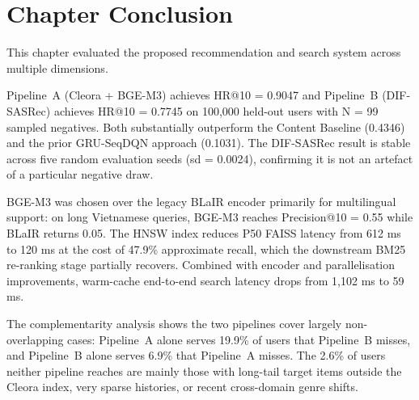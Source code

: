 \section{Chapter Conclusion}

This chapter evaluated the proposed recommendation and search system across multiple dimensions.

Pipeline~A (Cleora + BGE-M3) achieves HR@10 = 0.9047 and Pipeline~B (DIF-SASRec) achieves HR@10 = 0.7745 on 100,000 held-out users with N = 99 sampled negatives.
Both substantially outperform the Content Baseline (0.4346) and the prior GRU-SeqDQN approach (0.1031).
The DIF-SASRec result is stable across five random evaluation seeds (sd = 0.0024), confirming it is not an artefact of a particular negative draw.

BGE-M3 was chosen over the legacy BLaIR encoder primarily for multilingual support: on long Vietnamese queries, BGE-M3 reaches Precision@10 = 0.55 while BLaIR returns 0.05.
The HNSW index reduces P50 FAISS latency from 612 ms to 120 ms at the cost of 47.9\% approximate recall, which the downstream BM25 re-ranking stage partially recovers.
Combined with encoder and parallelisation improvements, warm-cache end-to-end search latency drops from 1,102 ms to 59 ms.

The complementarity analysis shows the two pipelines cover largely non-overlapping cases: Pipeline~A alone serves 19.9\% of users that Pipeline~B misses, and Pipeline~B alone serves 6.9\% that Pipeline~A misses.
The 2.6\% of users neither pipeline reaches are mainly those with long-tail target items outside the Cleora index, very sparse histories, or recent cross-domain genre shifts.
